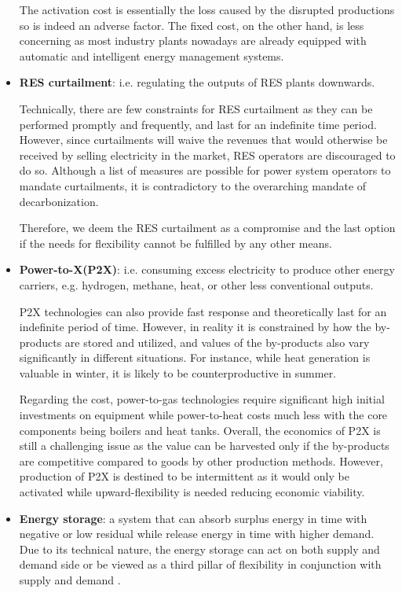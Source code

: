 \begin{itemize}
	The activation cost is essentially the loss caused by the disrupted productions so is indeed an adverse factor. The fixed cost, on the other hand, is less concerning as most industry plants nowadays are already equipped with automatic and intelligent energy management systems.
	
	\item \textbf{RES curtailment}: i.e. regulating the outputs of RES plants downwards.
	
	Technically, there are few constraints for RES curtailment as they can be performed promptly and frequently, and last for an indefinite time period. However, since curtailments will waive the revenues that would otherwise be received by selling electricity in the market, RES operators are discouraged to do so. Although a list of measures are possible for power system operators to mandate curtailments, it is contradictory to the overarching mandate of decarbonization. 
	
	Therefore, we deem the RES curtailment as a compromise and the last option if the needs for flexibility cannot be fulfilled by any other means.
	
	\item \textbf{Power-to-X(P2X)}: i.e. consuming excess electricity to produce other energy carriers, e.g. hydrogen, methane, heat, or other less conventional outputs.
	
	P2X technologies can also provide fast response and theoretically last for an indefinite period of time. However, in reality it is constrained by how the by-products are stored and utilized, and values of the by-products also vary significantly in different situations. For instance, while heat generation is valuable in winter, it is likely to be counterproductive in summer. 
	
	Regarding the cost, power-to-gas technologies require significant high initial investments on equipment while power-to-heat costs much less with the core components being boilers and heat tanks. Overall, the economics of P2X is still a challenging issue as the value can be harvested only if the by-products are competitive compared to goods by other production methods. However, production of P2X is destined to be intermittent as it would only be activated while upward-flexibility is needed reducing economic viability.
	
	\item \textbf{Energy storage}: a system that can absorb surplus energy in time with negative or low residual while release energy in time with higher demand. Due to its technical nature, the energy storage can act on both supply and demand side or be viewed as a third pillar of flexibility in conjunction with supply and demand \cite{Gunter2016}.
	

\end{itemize}
